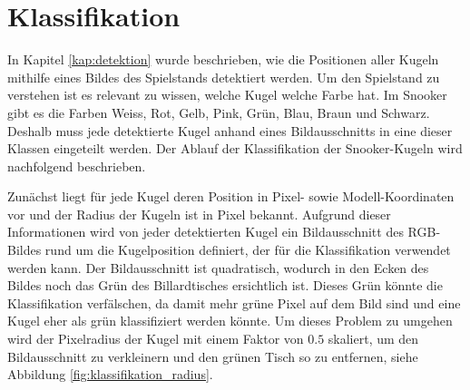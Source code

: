 \newpage
\section{Klassifikation}\label{kap:klassifikation}
In Kapitel \ref{kap:detektion} wurde beschrieben, wie die Positionen aller Kugeln mithilfe eines Bildes des Spielstands detektiert werden.
Um den Spielstand zu verstehen ist es relevant zu wissen, welche Kugel welche Farbe hat.
Im Snooker gibt es die Farben Weiss, Rot, Gelb, Pink, Grün, Blau, Braun und Schwarz.
Deshalb muss jede detektierte Kugel anhand eines Bildausschnitts in eine dieser Klassen eingeteilt werden.
Der Ablauf der Klassifikation der Snooker-Kugeln wird nachfolgend beschrieben.

Zunächst liegt für jede Kugel deren Position in Pixel- sowie Modell-Koordinaten vor und der Radius der Kugeln ist in Pixel bekannt\cite{project2:pixel_to_model_coordinates}.
Aufgrund dieser Informationen wird von jeder detektierten Kugel ein Bildausschnitt des RGB-Bildes rund um die Kugelposition definiert,
der für die Klassifikation verwendet werden kann.
Der Bildausschnitt ist quadratisch, wodurch in den Ecken des Bildes noch das Grün des Billardtisches ersichtlich ist.
Dieses Grün könnte die Klassifikation verfälschen, da damit mehr grüne Pixel auf dem Bild sind und eine Kugel eher als grün klassifiziert werden könnte.
Um dieses Problem zu umgehen wird der Pixelradius der Kugel mit einem Faktor von $0.5$ skaliert, um den Bildausschnitt zu verkleinern
und den grünen Tisch so zu entfernen, siehe Abbildung \ref{fig:klassifikation_radius}.

